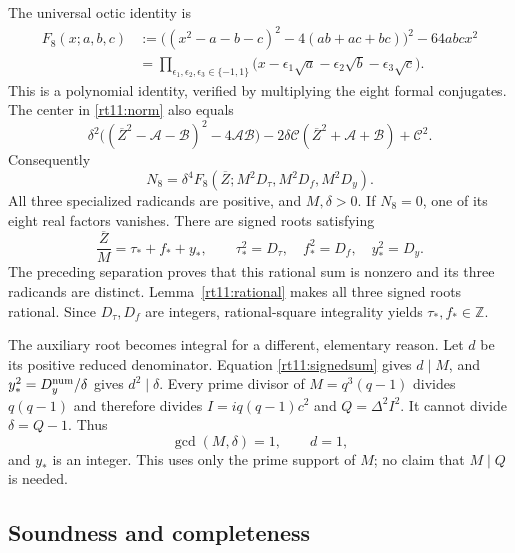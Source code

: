 The universal octic identity is
\begin{align}
 F_8(x;a,b,c)
 &:=\bigl((x^2-a-b-c)^2-4(ab+ac+bc)\bigr)^2-64abcx^2
       \nonumber\\
 &=\prod_{\epsilon_1,\epsilon_2,\epsilon_3\in\{-1,1\}}
       \bigl(x-\epsilon_1\sqrt a-\epsilon_2\sqrt b
                    -\epsilon_3\sqrt c\bigr).
 \label{rt11:genericnorm}
\end{align}
This is a polynomial identity, verified by multiplying the eight formal
conjugates. The center in \eqref{rt11:norm} also equals
\[
 \delta^2\bigl((\overline Z^2-\mathcal A-\mathcal B)^2
                       -4\mathcal A\mathcal B\bigr)
 -2\delta\mathcal C(\overline Z^2+\mathcal A+\mathcal B)
 +\mathcal C^2.
\]
Consequently
\begin{equation}
 N_8=\delta^4F_8
       (\overline Z;M^2D_\tau,M^2D_f,M^2D_y).
 \label{rt11:clearing}
\end{equation}
All three specialized radicands are positive, and $M,\delta>0$.
If $N_8=0$, one of its eight real factors vanishes. There are signed
roots satisfying
\begin{equation}
 \frac{\overline Z}{M}=\tau_*+f_*+y_*,
 \qquad \tau_*^2=D_\tau,\quad f_*^2=D_f,\quad y_*^2=D_y.
 \label{rt11:signedsum}
\end{equation}
The preceding separation proves that this rational sum is nonzero and
its three radicands are distinct. Lemma~\ref{rt11:rational} makes all
three signed roots rational. Since $D_\tau,D_f$ are integers,
rational-square integrality yields $\tau_*,f_*\in\mathbb Z$.

The auxiliary root becomes integral for a different, elementary reason.
Let $d$ be its positive reduced denominator. Equation
\eqref{rt11:signedsum} gives $d\mid M$, and
$y_*^2=D_y^{\rm num}/\delta$ gives $d^2\mid\delta$.
Every prime divisor of $M=q^3(q-1)$ divides $q(q-1)$ and therefore divides
$I=iq(q-1)c^2$ and $Q=\Delta^2I^2$. It cannot divide $\delta=Q-1$.
Thus
\[
 \gcd(M,\delta)=1,\qquad d=1,
\]
and $y_*$ is an integer. This uses only the prime support of $M$; no
claim that $M\mid Q$ is needed.

\subsection{Soundness and completeness}

